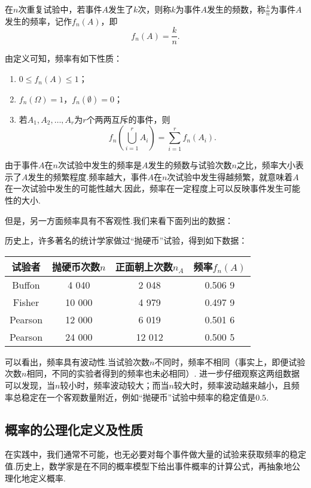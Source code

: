 \begin{definition}
在\(n\)次重复试验中，若事件\(A\)发生了\(k\)次，则称\(k\)为事件\(A\)发生的频数，称\(\frac{k}{n}\)为事件\(A\)发生的频率，记作\(f_n(A)\)，即\[
f_n(A) = \frac{k}{n}.
\]
\end{definition}

\begin{property}
由定义可知，频率有如下性质：\begin{enumerate}
\item \(0 \leqslant f_n(A) \leqslant 1\)；
\item \(f_n(\Omega) = 1\)，\(f_n(\emptyset) = 0\)；
\item 若\(A_1,A_2,\dotsc,A_r\)为\(r\)个两两互斥的事件，则\[
f_n\left(\bigcup_{i=1}^{r}{A_i}\right)
= \sum\limits_{i=1}^{r}{f_n(A_i)}.
\]
\end{enumerate}
\end{property}

由于事件\(A\)在\(n\)次试验中发生的频率是\(A\)发生的频数与试验次数\(n\)之比，频率大小表示了\(A\)发生的频繁程度.频率越大，事件\(A\)在\(n\)次试验中发生得越频繁，就意味着\(A\)在一次试验中发生的可能性越大.因此，频率在一定程度上可以反映事件发生可能性的大小.

但是，另一方面频率具有不客观性.我们来看下面列出的数据：
\begin{example}
历史上，许多著名的统计学家做过“抛硬币”试验，得到如下数据：
\begin{center}
\begin{tabular}{c|c|c|c}
\hline
试验者 & 抛硬币次数\(n\) & 正面朝上次数\(n_A\) & 频率\(f_n(A)\) \\ \hline
Buffon & 4 040 & 2 048 & 0.506 9 \\
Fisher & 10 000 & 4 979 & 0.497 9 \\
Pearson & 12 000 & 6 019 & 0.501 6 \\
Pearson & 24 000 & 12 012 & 0.500 5 \\ \hline
\end{tabular}
\end{center}
\end{example}
可以看出，频率具有波动性.当试验次数\(n\)不同时，频率不相同（事实上，即便试验次数\(n\)相同，不同的实验者得到的频率也未必相同）.
进一步仔细观察这两组数据可以发现，当\(n\)较小时，频率波动较大；而当\(n\)较大时，频率波动越来越小，且频率总稳定在一个客观数量附近，例如“抛硬币”试验中频率的稳定值是\(0.5\).

\subsection{概率的公理化定义及性质}
在实践中，我们通常不可能，也无必要对每个事件做大量的试验来获取频率的稳定值.历史上，数学家是在不同的概率模型下给出事件概率的计算公式，再抽象地公理化地定义概率.

